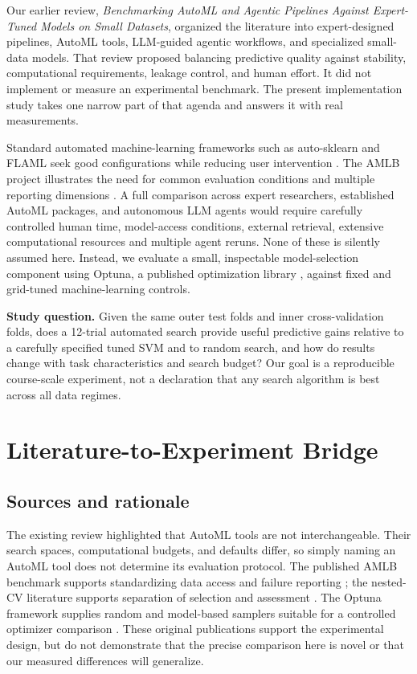 \documentclass[11pt,a4paper]{article}
\begin{document}
Our earlier review, \emph{Benchmarking AutoML and Agentic Pipelines Against Expert-Tuned Models on Small Datasets}, organized the literature into expert-designed pipelines, AutoML tools, LLM-guided agentic workflows, and specialized small-data models. That review proposed balancing predictive quality against stability, computational requirements, leakage control, and human effort. It did not implement or measure an experimental benchmark. The present implementation study takes one narrow part of that agenda and answers it with real measurements.

Standard automated machine-learning frameworks such as auto-sklearn and FLAML seek good configurations while reducing user intervention \cite{feurer2015,wang2021}. The AMLB project illustrates the need for common evaluation conditions and multiple reporting dimensions \cite{gijsbers2024}. A full comparison across expert researchers, established AutoML packages, and autonomous LLM agents would require carefully controlled human time, model-access conditions, external retrieval, extensive computational resources and multiple agent reruns. None of these is silently assumed here. Instead, we evaluate a small, inspectable model-selection component using Optuna, a published optimization library \cite{akiba2019}, against fixed and grid-tuned machine-learning controls.

\textbf{Study question.} Given the same outer test folds and inner cross-validation folds, does a 12-trial automated search provide useful predictive gains relative to a carefully specified tuned SVM and to random search, and how do results change with task characteristics and search budget? Our goal is a reproducible course-scale experiment, not a declaration that any search algorithm is best across all data regimes.

\section{Literature-to-Experiment Bridge}
\subsection{Sources and rationale}
The existing review highlighted that AutoML tools are not interchangeable. Their search spaces, computational budgets, and defaults differ, so simply naming an AutoML tool does not determine its evaluation protocol. The published AMLB benchmark supports standardizing data access and failure reporting \cite{gijsbers2024}; the nested-CV literature supports separation of selection and assessment \cite{varma2006}. The Optuna framework supplies random and model-based samplers suitable for a controlled optimizer comparison \cite{akiba2019}. These original publications support the experimental design, but do not demonstrate that the precise comparison here is novel or that our measured differences will generalize.
\end{document}
